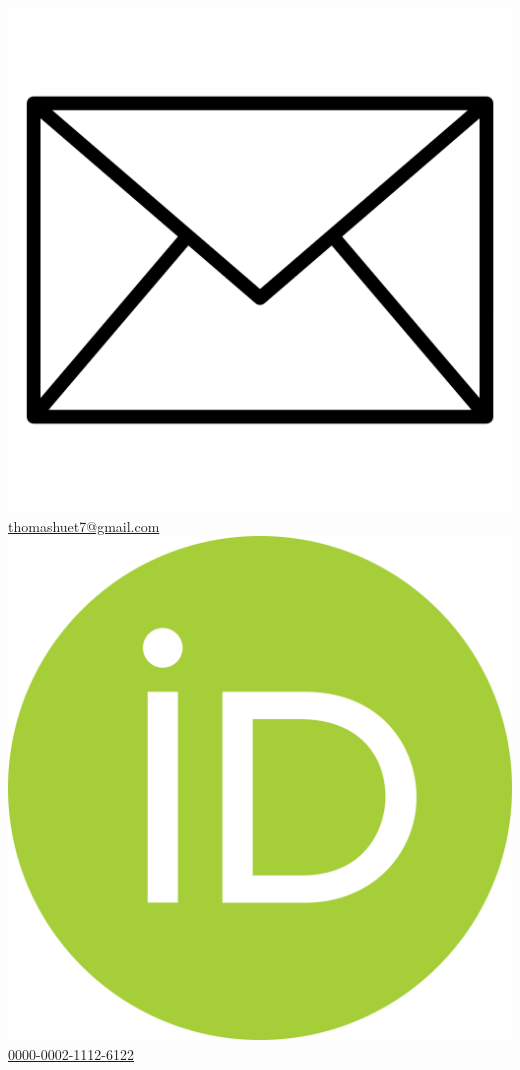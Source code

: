 \documentclass{article}
\begin{document}
\includegraphics[scale=0.025]{gmail} \quad \href{mailto:thomashuet7@gmail.com}{thomashuet7@gmail.com} \\
\includegraphics[scale=0.01]{orcid} \quad \href{https://orcid.org/0000-0002-1112-6122}{0000-0002-1112-6122} \\
\end{document}
